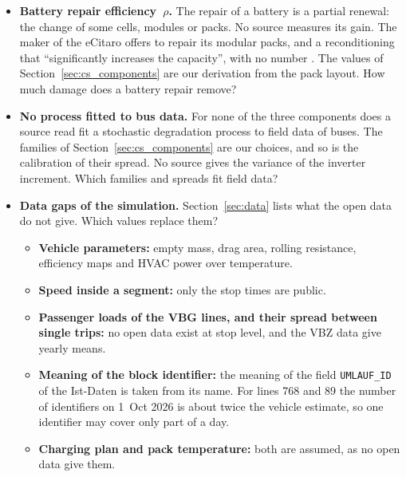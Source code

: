 \documentclass[11pt,a4paper]{article}
\theoremstyle{plain}
\theoremstyle{definition}
\theoremstyle{remark}
\begin{document}
\begin{itemize}
    In one study of a car, the SiC modules took 19 to 62 times less damage per run of a drive cycle than a silicon IGBT (insulated-gate bipolar transistor) module (our computation from \cite[Tables~5.1--5.2]{Amirpour2025}).
    What is the damage per stop of a bus inverter?
  \item \textbf{Battery repair efficiency~$\rho$.}
    The repair of a battery is a partial renewal: the change of some cells, modules or packs.
    No source measures its gain.
    The maker of the eCitaro offers to repair its modular packs, and a reconditioning that ``significantly increases the capacity'', with no number \cite{DaimlerTruck2025offers}.
    The values of Section~\ref{sec:cs_components} are our derivation from the pack layout.
    How much damage does a battery repair remove?
  \item \textbf{No process fitted to bus data.}
    For none of the three components does a source read fit a stochastic degradation process to field data of buses.
    The families of Section~\ref{sec:cs_components} are our choices, and so is the calibration of their spread.
    No source gives the variance of the inverter increment.
    Which families and spreads fit field data?
  \item \textbf{Data gaps of the simulation.}
    Section~\ref{sec:data} lists what the open data do not give.
    Which values replace them?
    \begin{itemize}
      \item \textbf{Vehicle parameters:} empty mass, drag area, rolling resistance, efficiency maps and HVAC power over temperature.
      \item \textbf{Speed inside a segment:} only the stop times are public.
      \item \textbf{Passenger loads of the VBG lines, and their spread between single trips:} no open data exist at stop level, and the VBZ data give yearly means.
      \item \textbf{Meaning of the block identifier:} the meaning of the field \texttt{UMLAUF\_ID} of the Ist-Daten is taken from its name.
        For lines 768 and 89 the number of identifiers on 1~Oct 2026 is about twice the vehicle estimate, so one identifier may cover only part of a day.
      \item \textbf{Charging plan and pack temperature:} both are assumed, as no open data give them.
    \end{itemize}
\end{itemize}
\end{document}
